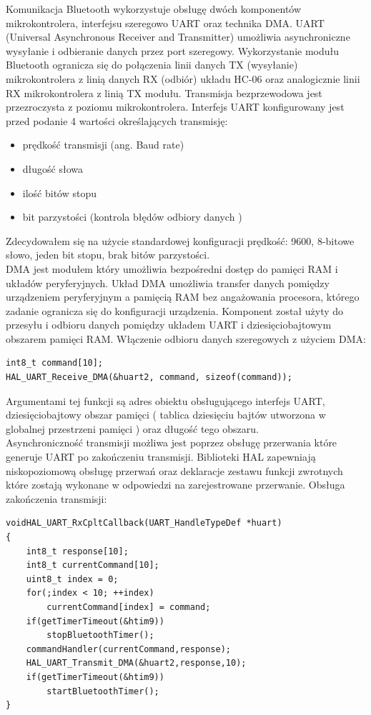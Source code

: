 \documentclass[eng,printmode]{mgr}
\begin{document}
Komunikacja Bluetooth wykorzystuje obsługę dwóch komponentów mikrokontrolera, interfejsu szeregowo UART oraz technika DMA. UART (Universal Asynchronous Receiver and Transmitter) umożliwia asynchroniczne wysyłanie i odbieranie danych przez port szeregowy. Wykorzystanie modułu Bluetooth ogranicza się do połączenia linii danych  TX (wysyłanie) mikrokontrolera z linią danych RX (odbiór) układu HC-06 oraz analogicznie linii RX mikrokontrolera z linią TX modułu. Transmisja bezprzewodowa jest przezroczysta z poziomu mikrokontrolera. Interfejs UART konfigurowany jest przed podanie 4 wartości określających transmisję:
\begin{itemize}
  \item prędkość transmisji (ang. Baud rate)
  \item długość słowa
  \item ilość bitów stopu
  \item bit parzystości (kontrola błędów odbiory danych )
\end{itemize}
Zdecydowałem się na użycie standardowej konfiguracji prędkość: 9600, 8-bitowe słowo, jeden bit stopu, brak bitów parzystości.
\\DMA jest modułem który umożliwia bezpośredni dostęp do pamięci RAM i układów peryferyjnych. Układ DMA umożliwia transfer danych pomiędzy urządzeniem peryferyjnym a pamięcią RAM bez angażowania procesora, którego zadanie ogranicza się do konfiguracji urządzenia. Komponent został użyty do przesyłu i odbioru danych pomiędzy układem UART i dziesięciobajtowym obszarem pamięci RAM. Włączenie odbioru danych szeregowych z użyciem DMA:
\begin{lstlisting}[style=c]
int8_t command[10];
HAL_UART_Receive_DMA(&huart2, command, sizeof(command));
\end{lstlisting}
Argumentami tej funkcji są adres obiektu obsługującego interfejs UART, dziesięciobajtowy obszar pamięci ( tablica dziesięciu bajtów utworzona w globalnej przestrzeni pamięci ) oraz długość tego obszaru. 
\\Asynchroniczność transmisji możliwa jest poprzez obsługę przerwania które generuje UART po zakończeniu transmisji. Biblioteki HAL zapewniają niskopoziomową obsługę przerwań oraz deklaracje zestawu funkcji zwrotnych które zostają wykonane w odpowiedzi na zarejestrowane przerwanie. Obsługa zakończenia transmisji:
\begin{lstlisting}[style=c]
voidHAL_UART_RxCpltCallback(UART_HandleTypeDef *huart)
{
	int8_t response[10];
	int8_t currentCommand[10];
	uint8_t index = 0;
	for(;index < 10; ++index)
		currentCommand[index] = command;
	if(getTimerTimeout(&htim9))
		stopBluetoothTimer();
	commandHandler(currentCommand,response);
	HAL_UART_Transmit_DMA(&huart2,response,10);
	if(getTimerTimeout(&htim9))
		startBluetoothTimer();
}
\end{lstlisting}
\end{document}

